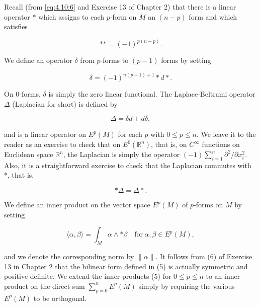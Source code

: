 \begin{definition}\label{thm:6.1}
Recall (from \eqref{eq:4.10:6} and Exercise 13 of Chapter 2) that there is a linear operator $\ast$ which assigns to each $p$-form on $M$ an  $ (n-p) $ form and which satisfies

\begin{equation}
\tag{1}\label{eq:6.1:1}
\ast\ast=(-1)^{p(n-p)}.
\end{equation}

We define an operator $\delta$ from $p$-forms to $(p-1)$ forms by setting

\begin{equation}
\tag{2}\label{eq:6.1:2}
\delta=(-1)^{n(p+1)+1}{*}d{*}.
\end{equation}

On 0-forms, $\delta$ is simply the zero linear functional. The Laplace-Beltrami operator $\Delta$ (Laplacian for short) is defined by

\begin{equation}
\tag{3}\label{eq:6.1:3}
\Delta=\delta d+d\delta,
\end{equation}

and is a linear operator on  $ E^p(M) $ for each  $ p $ with  $ 0 \leq p \leq n $. We leave it to the reader as an exercise to check that on $E^{0}(\mathbb{R}^{n})$, that is, on $C^{\infty}$ functions on Euclidean space $\mathbb{R}^{n}$, the Laplacian is simply the operator $(-1)\sum_{i=1}^{n}\partial^{2}/\partial x_{i}^{2}$. Also, it is a straightforward exercise to check that the Laplacian commutes with *, that is,

\begin{equation}
\tag{4}\label{eq:6.1:4}
\ast\Delta=\Delta\ast.
\end{equation}

We define an inner product on the vector space $E^{p}(M)$ of $p$-forms on $M$ by setting

\begin{equation}
\tag{5}\label{eq:6.1:5}
\langle\alpha,\beta\rangle=\int_{M}\alpha\wedge\ast\beta\quad\mathrm{for}\ \alpha,\beta\in E^{p}(M),
\end{equation}

and we denote the corresponding norm by  $ \|\alpha\| $. It follows from (6) of Exercise 13 in Chapter 2 that the bilinear form defined in (5) is actually symmetric and positive definite. We extend the inner products (5) for  $ 0 \leq p \leq n $ to an inner product on the direct sum  $ \sum_{p=0}^{n} E^p(M) $ simply by requiring the various  $ E^p(M) $ to be orthogonal.

\end{definition}

